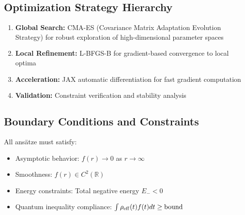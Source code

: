\documentclass[11pt]{article}
\begin{document}
\subsection*{Optimization Strategy Hierarchy}
\begin{enumerate}
\item \textbf{Global Search:} CMA-ES (Covariance Matrix Adaptation Evolution Strategy) for robust exploration of high-dimensional parameter spaces
\item \textbf{Local Refinement:} L-BFGS-B for gradient-based convergence to local optima
\item \textbf{Acceleration:} JAX automatic differentiation for fast gradient computation
\item \textbf{Validation:} Constraint verification and stability analysis
\end{enumerate}

\subsection*{Boundary Conditions and Constraints}
All ansätze must satisfy:
\begin{itemize}
\item Asymptotic behavior: $f(r) \to 0$ as $r \to \infty$
\item Smoothness: $f(r) \in C^2(\mathbb{R})$
\item Energy constraints: Total negative energy $E_- < 0$
\item Quantum inequality compliance: $\int \rho_{\rm eff}(t)f(t)dt \geq \text{bound}$
\end{itemize}
\end{document}
